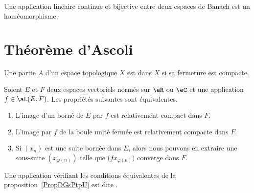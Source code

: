 
\begin{theorem}  \label{ThofQShsw}
    Une application linéaire continue et bijective entre deux espaces de Banach est un homéomorphisme.
\end{theorem}

\section{Théorème d'Ascoli}

\begin{definition}
    Une partie \( A\) d'un espace topologique \( X\) est  dans \( X\) si sa fermeture est compacte.
\end{definition}

\begin{proposition} \label{PropDGsPtpU}
    Soient \( E\) et \( F\) deux espaces vectoriels normés sur \( \eR\) ou \( \eC\) et une application \( f\in\aL(E,F)\). Les propriétés suivantes sont équivalentes.
    \begin{enumerate}
        \item
            L'image d'un borné de \( E\) par \( f\) est relativement compact dans \( F\).
        \item   \label{ItemJIkpUbLii}
            L'image par \( f\) de la boule unité fermée est relativement compacte dans \( F\).
        \item
            Si \( (x_n)\) est une suite bornée dans \( E\), alors nous pouvons en extraire une sous-suite \( (x_{\varphi(n)})\) telle que \( \big( fx_{\varphi(n)} \big)\) converge dans \( F\).
    \end{enumerate}
\end{proposition}

\begin{definition}
    Une application vérifiant les conditions équivalentes de la proposition~\ref{PropDGsPtpU} est dite .
\end{definition}


